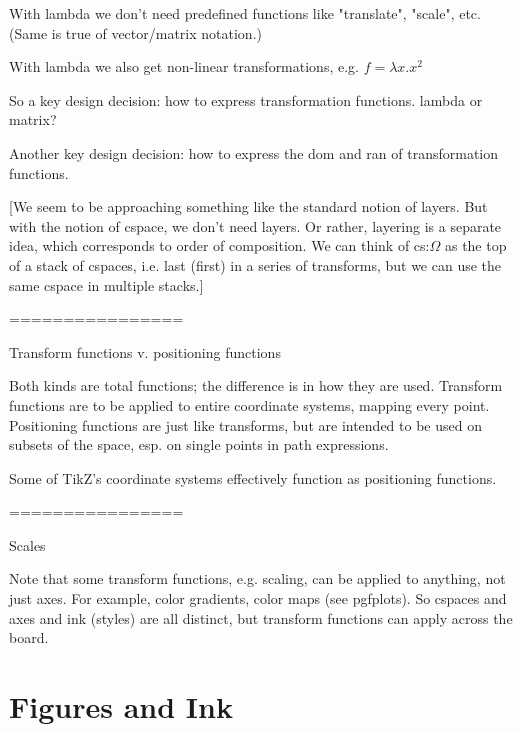 \documentclass[12pt]{tufte-handout}
\numberwithin{equation}{subsection}
\numberwithin{equation}{subsection}
\begin{document}
  With lambda we don't need predefined functions like "translate",
  "scale", etc.  (Same is true of vector/matrix notation.)

  With lambda we also get non-linear transformations, e.g.
  \(f = \lambda x.x^2\)

  So a key design decision: how to express transformation functions.
  lambda or matrix?

  Another key design decision: how to express the dom and ran of
  transformation functions.

  [We seem to be approaching something like the standard notion of
    layers.  But with the notion of cspace, we don't need layers.  Or
    rather, layering is a separate idea, which corresponds to order of
    composition.  We can think of cs:$\Omega$ as the top of a stack of
    cspaces, i.e. last (first) in a series of transforms, but we can use
    the same cspace in multiple stacks.]

  ================

  Transform functions v. positioning functions

  Both kinds are total functions; the difference is in how they are
  used.  Transform functions are to be applied to entire coordinate
  systems, mapping every point.  Positioning functions are just like
  transforms, but are intended to be used on subsets of the space,
  esp. on single points in path expressions.

  Some of TikZ's coordinate systems effectively function as positioning functions.

  ================

  Scales

  Note that some transform functions, e.g. scaling, can be applied to
  anything, not just axes.  For example, color gradients, color maps
  (see pgfplots).  So cspaces and axes and ink (styles) are all
  distinct, but transform functions can apply across the board.





  \part{Figures and Ink}
  \label{sect:representation}
\end{document}
